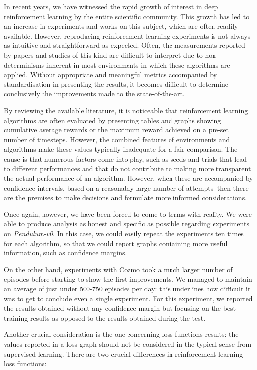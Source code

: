 In recent years, we have witnessed the rapid growth of interest in deep reinforcement learning by the entire scientific community.
This growth has led to an increase in experiments and works on this subject, which are often readily available.
However, reproducing reinforcement learning experiments is not always as intuitive and straightforward as expected.
Often, the measurements reported by papers and studies of this kind are difficult to interpret due to non-determinisms inherent in most environments in which these algorithms are applied.
Without appropriate and meaningful metrics accompanied by standardisation in presenting the results, it becomes difficult to determine conclusively the improvements made to the state-of-the-art.

By reviewing the available literature, it is noticeable that reinforcement learning algorithms are often evaluated by presenting tables and graphs showing cumulative average rewards or the maximum reward achieved on a pre-set number of timesteps.
However, the combined features of environments and algorithms make these values typically inadequate for a fair comparison.
The cause is that numerous factors come into play, such as seeds and trials that lead to different performances and that do not contribute to making more transparent the actual performance of an algorithm.
However, when these are accompanied by confidence intervals, based on a reasonably large number of attempts, then there are the premises to make decisions and formulate more informed considerations.

Once again, however, we have been forced to come to terms with reality.
We were able to produce analysis as honest and specific as possible regarding experiments on \textit{Pendulum-v0}.
In this case, we could easily repeat the experiments ten times for each algorithm, so that we could report graphs containing more useful information, such as confidence margins.

On the other hand, experiments with Cozmo took a much larger number of episodes before starting to show the first improvements.
We managed to maintain an average of just under 500-750 episodes per day: this underlines how difficult it was to get to conclude even a single experiment.
For this experiment, we reported the results obtained without any confidence margin but focusing on the best training results as opposed to the results obtained during the test.

Another crucial consideration is the one concerning loss functions results: the values reported in a loss graph should not be considered in the typical sense from supervised learning.
There are two crucial differences in reinforcement learning loss functions:

